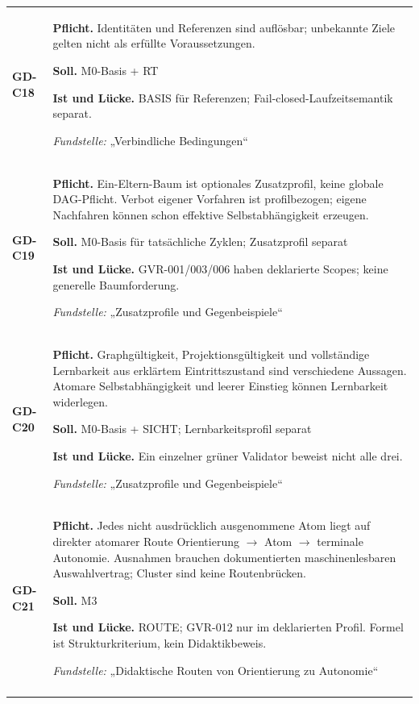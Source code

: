 \begin{longtable}{@{}P{20mm}P{128mm}@{}}
\label{rule:GD-C18}\textbf{GD-C18} &
\textbf{Pflicht.} Identitäten und Referenzen sind auflösbar; unbekannte Ziele gelten nicht als erfüllte Voraussetzungen.\par\smallskip
\textbf{Soll.} M0-Basis + RT\par\smallskip
\textbf{Ist und Lücke.} BASIS für Referenzen; Fail-closed-Laufzeitsemantik separat.\par\smallskip
\emph{Fundstelle:} „Verbindliche Bedingungen“\\\addlinespace[5pt]
\label{rule:GD-C19}\textbf{GD-C19} &
\textbf{Pflicht.} Ein-Eltern-Baum ist optionales Zusatzprofil, keine globale DAG-Pflicht. Verbot eigener Vorfahren ist profilbezogen; eigene Nachfahren können schon effektive Selbstabhängigkeit erzeugen.\par\smallskip
\textbf{Soll.} M0-Basis für tatsächliche Zyklen; Zusatzprofil separat\par\smallskip
\textbf{Ist und Lücke.} GVR-001/003/006 haben deklarierte Scopes; keine generelle Baumforderung.\par\smallskip
\emph{Fundstelle:} „Zusatzprofile und Gegenbeispiele“\\\addlinespace[5pt]
\label{rule:GD-C20}\textbf{GD-C20} &
\textbf{Pflicht.} Graphgültigkeit, Projektionsgültigkeit und vollständige Lernbarkeit aus erklärtem Eintrittszustand sind verschiedene Aussagen. Atomare Selbstabhängigkeit und leerer Einstieg können Lernbarkeit widerlegen.\par\smallskip
\textbf{Soll.} M0-Basis + SICHT; Lernbarkeitsprofil separat\par\smallskip
\textbf{Ist und Lücke.} Ein einzelner grüner Validator beweist nicht alle drei.\par\smallskip
\emph{Fundstelle:} „Zusatzprofile und Gegenbeispiele“\\\addlinespace[5pt]
\label{rule:GD-C21}\textbf{GD-C21} &
\textbf{Pflicht.} Jedes nicht ausdrücklich ausgenommene Atom liegt auf direkter atomarer Route Orientierung \ensuremath{\to} Atom \ensuremath{\to} terminale Autonomie. Ausnahmen brauchen dokumentierten maschinenlesbaren Auswahlvertrag; Cluster sind keine Routenbrücken.\par\smallskip
\textbf{Soll.} M3\par\smallskip
\textbf{Ist und Lücke.} ROUTE; GVR-012 nur im deklarierten Profil. Formel ist Strukturkriterium, kein Didaktikbeweis.\par\smallskip
\emph{Fundstelle:} „Didaktische Routen von Orientierung zu Autonomie“\\\addlinespace[5pt]

\end{longtable}
